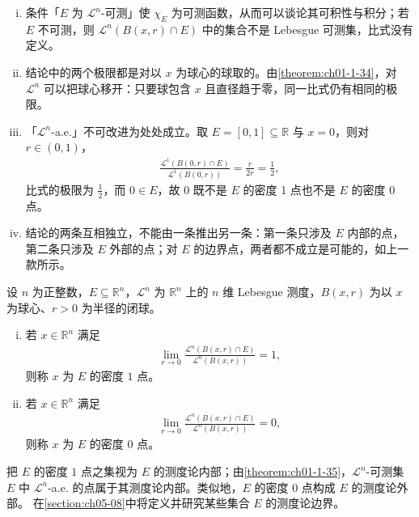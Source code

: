 \documentclass[../../main.tex]{subfiles}%
\begin{document}
\begin{remark}\label{remark:ch01-thm-1-35-条件}
\begin{enumerate}[(i)]
\item 条件「$E$ 为 $\mathcal{L}^{n}$-可测」使 $\chi_{E}$ 为可测函数，从而可以谈论其可积性与积分；若 $E$ 不可测，则 $\mathcal{L}^{n}(B(x,r)\cap E)$ 中的集合不是 Lebesgue 可测集，比式没有定义。
\item 结论中的两个极限都是对以 $x$ 为球心的球取的。由\cref{theorem:ch01-1-34}，对 $\mathcal{L}^{n}$ 可以把球心移开：只要球包含 $x$ 且直径趋于零，同一比式仍有相同的极限。%
\item 「$\mathcal{L}^{n}$-a.e.」不可改进为处处成立。取 $E=[0,1]\subseteq\mathbb{R}$ 与 $x=0$，则对 $r\in(0,1)$，
\begin{align*}
\frac{\mathcal{L}^{1}(B(0,r)\cap E)}{\mathcal{L}^{1}(B(0,r))}=\frac{r}{2r}=\frac{1}{2} ,
\end{align*}
比式的极限为 $\frac{1}{2}$，而 $0\in E$，故 $0$ 既不是 $E$ 的密度 1 点也不是 $E$ 的密度 0 点。
\item 结论的两条互相独立，不能由一条推出另一条：第一条只涉及 $E$ 内部的点，第二条只涉及 $E$ 外部的点；对 $E$ 的边界点，两者都不成立是可能的，如上一款所示。
\end{enumerate}
\end{remark}

\begin{definition}[密度 1 点与密度 0 点]\label{definition:ch01-1-25}
设 $n$ 为正整数，$E\subseteq\mathbb{R}^n$，$\mathcal{L}^{n}$ 为 $\mathbb{R}^n$ 上的 $n$ 维 Lebesgue 测度，$B(x,r)$ 为以 $x$ 为球心、$r>0$ 为半径的闭球。
\begin{enumerate}[(i)]
\item 若 $x\in\mathbb{R}^n$ 满足
\begin{align*}
\lim_{r\to0}\frac{\mathcal{L}^{n}(B(x,r)\cap E)}{\mathcal{L}^{n}(B(x,r))}=1 ,
\end{align*}
则称 $x$ 为 $E$ 的密度 $1$ 点。
\item 若 $x\in\mathbb{R}^n$ 满足
\begin{align*}
\lim_{r\to0}\frac{\mathcal{L}^{n}(B(x,r)\cap E)}{\mathcal{L}^{n}(B(x,r))}=0 ,
\end{align*}
则称 $x$ 为 $E$ 的密度 $0$ 点。
\end{enumerate}
\end{definition}

\begin{remark}\label{remark:ch01-def-1-25-测度内外}
把 $E$ 的密度 $1$ 点之集视为 $E$ 的测度论内部；由\cref{theorem:ch01-1-35}，$\mathcal{L}^{n}$-可测集 $E$ 中 $\mathcal{L}^{n}$-a.e. 的点属于其测度论内部。类似地，$E$ 的密度 $0$ 点构成 $E$ 的测度论外部。%
在\cref{section:ch05-08}中将定义并研究某些集合 $E$ 的测度论边界。%
\end{remark}
\end{document}

